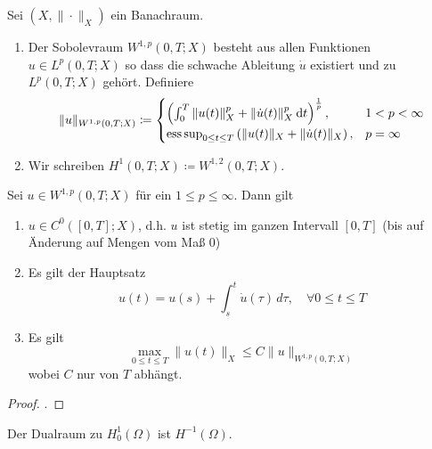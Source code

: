 \documentclass[../skript.tex]{subfiles}
\begin{document}

\begin{definition}\label{def:c4e2s4}
	Sei $(X,\|\cdot\|_X)$ ein Banachraum.
 	\begin{enumerate}
 		\item Der Sobolevraum $W^{1,p}(0,T;X)$ besteht aus allen Funktionen $u\in L^p(0,T;X)$
 			so dass die schwache Ableitung $\dot{u}$ existiert und zu $L^p(0,T;X)$ gehört. Definiere 
 			\[
 				\|u\|_{W^{1,p}(0,T;X)} \coloneqq 
 				\begin{cases} 
 					\left(\int_0^T\|u(t)\|_X^p + \|\dot{u}(t)\|_X^p \:\mathrm{d}t\right)^{\frac{1}{p}} ,&1<p<\infty \\
 					\operatorname*{ess\,sup}_{0\leq t\leq T} \left( \|u(t)\|_X + \|\dot{u}(t)\|_X\right ), &p=\infty
 				\end{cases}
 			\]
 		\item Wir schreiben $H^1(0,T;X) \coloneqq W^{1,2}(0,T;X)$.
 	\end{enumerate}
\end{definition}

\begin{theorem}\label{thm:c4s2s5}
	Sei $u\in W^{1,p}(0,T;X)$ für ein $1\leq p\leq\infty$. Dann gilt
	\begin{enumerate}
		\item $u\in C^0([0,T];X)$, d.h. $u$ ist stetig im ganzen Intervall $[0,T]$ (bis auf Änderung auf Mengen vom Maß $0$)
		\item Es gilt der Hauptsatz
			\[
				u(t) = u(s) + \int_s^t \dot{u}(\tau)\,d\tau,\quad\forall 0\leq t\leq T
			\]
		\item Es gilt 
			\[
				\max_{0\leq t\leq T} \|u(t)\|_X \leq C\|u\|_{W^{1,p}(0,T;X)}
			\]
			wobei $C$ nur von $T$ abhängt. 
	\end{enumerate}
\end{theorem}

\begin{proof}
	\cite[S.286]{Evans}.
\end{proof}

\begin{remark*}
	Der Dualraum zu $H^1_0(\Omega)$ ist $H^{-1}(\Omega)$.
\end{remark*}
\end{document}
